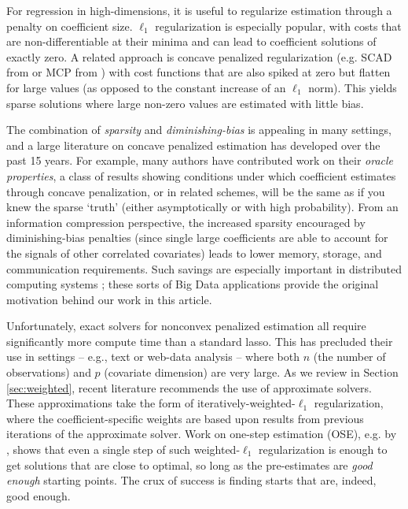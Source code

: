 \documentclass[12pt]{article}
\begin{document}
For regression in high-dimensions, it is useful to regularize estimation
through a penalty on coefficient size.   $\ell_1$  regularization \citep[i.e.,
the lasso of][]{tibshirani_regression_1996} is especially popular, with costs
that are non-differentiable at their minima and can lead to  coefficient
solutions of exactly zero.  A related approach is concave penalized
regularization (e.g. SCAD from \citealt{fan_variable_2001} or MCP from
\citealt{zhang_nearly_2010}) with cost functions that are also spiked at zero
but flatten for large values (as opposed to the constant increase of an $\ell_1$
norm).  This yields sparse solutions where  large non-zero values are estimated
with little bias. 

The combination of  \textit{sparsity} and \textit{diminishing-bias} 
 is appealing in many settings, and a large literature on concave
penalized estimation has developed over the past 15 years.  For example, many
authors \citep{fan_variable_2001,fan_nonconcave_2004}  have contributed work on their \textit{oracle
properties}, a class of results showing conditions under which coefficient
estimates through concave penalization, or in related schemes, will be the
same as if you knew the sparse `truth' (either asymptotically or with high
probability).   From an information compression perspective,  the increased
sparsity encouraged by diminishing-bias penalties (since single large
coefficients are able to account for the signals of other correlated
covariates) leads to lower memory, storage, and communication requirements.
Such savings are especially important in distributed  computing systems
\citep[e.g.,][]{taddy_distributed_2015,gentzkow_measuring_2015}; these sorts of Big Data applications provide the original motivation behind our work in this article.


Unfortunately,  exact solvers for nonconvex penalized estimation  all require
significantly more compute time than a standard lasso.  This has precluded their use in settings -- e.g., text or web-data analysis
-- where both $n$ (the number of observations) and $p$ (covariate dimension)
   are very large. As we review in Section \ref{sec:weighted},  recent
   literature recommends the use of approximate solvers. These approximations
   take the form of iteratively-weighted-$\ell_1$ regularization, where the
   coefficient-specific weights are based upon results from previous
   iterations of the approximate solver.  Work on one-step estimation (OSE),
   e.g. by
   \cite{zou_one-step_2008}, shows that even a single step of such
   weighted-$\ell_1$ regularization is enough to get solutions that are close to
   optimal, so long as the pre-estimates are
\textit{good enough} starting points. 
The crux of success is  finding starts that are, indeed, good enough.
\end{document}
